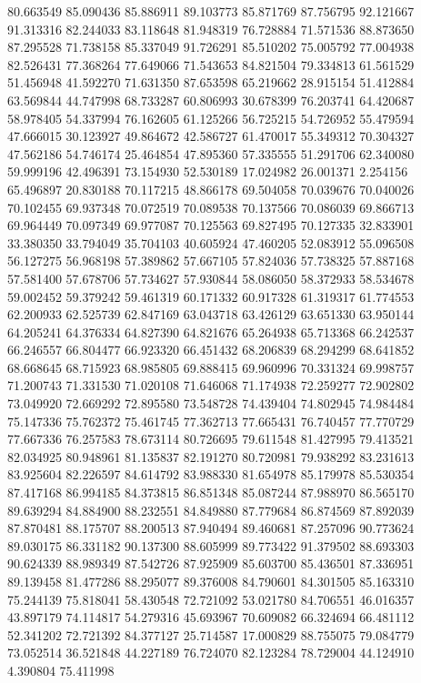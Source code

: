 80.663549
85.090436
85.886911
89.103773
85.871769
87.756795
92.121667
91.313316
82.244033
83.118648
81.948319
76.728884
71.571536
88.873650
87.295528
71.738158
85.337049
91.726291
85.510202
75.005792
77.004938
82.526431
77.368264
77.649066
71.543653
84.821504
79.334813
61.561529
51.456948
41.592270
71.631350
87.653598
65.219662
28.915154
51.412884
63.569844
44.747998
68.733287
60.806993
30.678399
76.203741
64.420687
58.978405
54.337994
76.162605
61.125266
56.725215
54.726952
55.479594
47.666015
30.123927
49.864672
42.586727
61.470017
55.349312
70.304327
47.562186
54.746174
25.464854
47.895360
57.335555
51.291706
62.340080
59.999196
42.496391
73.154930
52.530189
17.024982
26.001371
2.254156
65.496897
20.830188
70.117215
48.866178
69.504058
70.039676
70.040026
70.102455
69.937348
70.072519
70.089538
70.137566
70.086039
69.866713
69.964449
70.097349
69.977087
70.125563
69.827495
70.127335
32.833901
33.380350
33.794049
35.704103
40.605924
47.460205
52.083912
55.096508
56.127275
56.968198
57.389862
57.667105
57.824036
57.738325
57.887168
57.581400
57.678706
57.734627
57.930844
58.086050
58.372933
58.534678
59.002452
59.379242
59.461319
60.171332
60.917328
61.319317
61.774553
62.200933
62.525739
62.847169
63.043718
63.426129
63.651330
63.950144
64.205241
64.376334
64.827390
64.821676
65.264938
65.713368
66.242537
66.246557
66.804477
66.923320
66.451432
68.206839
68.294299
68.641852
68.668645
68.715923
68.985805
69.888415
69.960996
70.331324
69.998757
71.200743
71.331530
71.020108
71.646068
71.174938
72.259277
72.902802
73.049920
72.669292
72.895580
73.548728
74.439404
74.802945
74.984484
75.147336
75.762372
75.461745
77.362713
77.665431
76.740457
77.770729
77.667336
76.257583
78.673114
80.726695
79.611548
81.427995
79.413521
82.034925
80.948961
81.135837
82.191270
80.720981
79.938292
83.231613
83.925604
82.226597
84.614792
83.988330
81.654978
85.179978
85.530354
87.417168
86.994185
84.373815
86.851348
85.087244
87.988970
86.565170
89.639294
84.884900
88.232551
84.849880
87.779684
86.874569
87.892039
87.870481
88.175707
88.200513
87.940494
89.460681
87.257096
90.773624
89.030175
86.331182
90.137300
88.605999
89.773422
91.379502
88.693303
90.624339
88.989349
87.542726
87.925909
85.603700
85.436501
87.336951
89.139458
81.477286
88.295077
89.376008
84.790601
84.301505
85.163310
75.244139
75.818041
58.430548
72.721092
53.021780
84.706551
46.016357
43.897179
74.114817
54.279316
45.693967
70.609082
66.324694
66.481112
52.341202
72.721392
84.377127
25.714587
17.000829
88.755075
79.084779
73.052514
36.521848
44.227189
76.724070
82.123284
78.729004
44.124910
4.390804
75.411998
